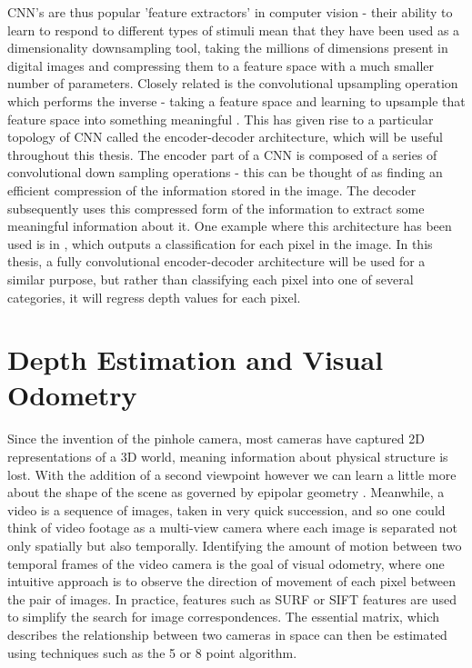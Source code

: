 \documentclass[openany]{book}
\begin{document}
CNN's are thus popular 'feature extractors' in computer vision - their ability to learn to respond to different types of stimuli mean that they have been used as a dimensionality downsampling tool, taking the millions of dimensions present in digital images  and compressing them to a feature space with a much smaller number of parameters. Closely related is the convolutional upsampling operation which performs the inverse - taking a feature space and learning to upsample that feature space into something meaningful \cite{long2014fcn}. This has given rise to a particular topology of CNN called the encoder-decoder architecture, which will be useful throughout this thesis. The encoder part of a CNN is composed of a series of convolutional down sampling operations - this can be thought of as finding an efficient compression of the information stored in the image. The decoder subsequently uses this compressed form of the information to extract some meaningful information about it. One example where this architecture has been used is in \cite{long2014fcn}, which outputs a classification for each pixel in the image. In this thesis, a fully convolutional encoder-decoder architecture will be used for a similar purpose, but rather than classifying each pixel into one of several categories, it will regress depth values for each pixel. 


\section{Depth Estimation and Visual Odometry}

Since the invention of the pinhole camera, most cameras have captured 2D representations of a 3D world, meaning information about physical structure is lost. With the addition of a second viewpoint however we can learn a little more about the shape of the scene as governed by epipolar geometry \cite{zisserman2004multiview}. Meanwhile, a video is a sequence of images, taken in very quick succession, and so one could think of video footage as a multi-view camera where each image is separated not only spatially but also temporally. Identifying the amount of motion between two temporal frames of the video camera is the goal of visual odometry, where one intuitive approach is to observe the direction of movement of each pixel between the pair of images. In practice, features such as SURF \cite{bay2008surf} or SIFT \cite{lowe2004sift} features are used to simplify the search for image correspondences. The essential matrix, which describes the relationship between two cameras in space can then be estimated using techniques such as the 5 or 8 point algorithm. 
\end{document}
